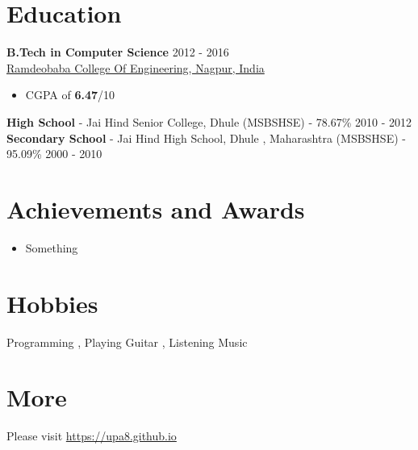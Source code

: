 \documentclass[margin, centered]{res}
\begin{document}
\begin{resume}
\section{Education}
\textbf{B.Tech in Computer Science} \hfill 2012 - 2016 \\
\href{http://rknec.edu}{Ramdeobaba College Of Engineering, Nagpur, India}
\begin{itemize}
 \item CGPA of \textbf{6.47}/10
\end{itemize}
\textbf{High School} - {Jai Hind Senior College, Dhule} (MSBSHSE) - 78.67\% \hfill 2010 - 2012 \\
\textbf{Secondary School} - Jai Hind High School, Dhule , Maharashtra (MSBSHSE) - 95.09\% \hfill 2000 - 2010


\section{Achievements and Awards}
\begin{itemize}[leftmargin=*]
 \item Something

\end{itemize}


\section{Hobbies}
Programming , Playing Guitar , Listening Music 
\section{More}
Please visit \href{https://upa8.github.io}{https://upa8.github.io}

\end{resume}
\end{document}
